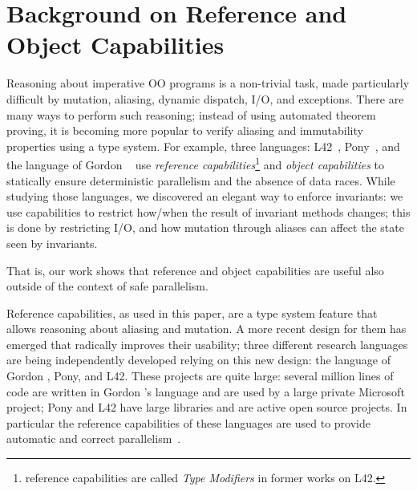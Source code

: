 \section{Background on Reference and Object Capabilities}
\label{s:TMsAndOCs}
Reasoning about imperative OO programs is a non-trivial task,
made particularly difficult by mutation, aliasing, dynamic dispatch, I/O, and exceptions. There are many ways to perform such reasoning;
instead of using automated theorem proving, 
it is becoming more popular to verify aliasing and immutability properties using a type system.
For example, three languages: L42~\cite{ServettoZucca15,ServettoEtAl13a,JOT:issue_2011_01/article1,GianniniEtAl16}, Pony~\cite{clebsch2015deny,clebsch2017orca}, and the language of Gordon \etal~\cite{GordonEtAl12} use \emph{reference capabilities}\footnote{reference capabilities are called \emph{Type Modifiers} in former works on L42.} and \emph{object capabilities} to statically ensure  deterministic parallelism and the absence of data races.
While studying those languages, we discovered an elegant way to enforce invariants: we use capabilities to restrict how/when the result of invariant methods changes; this is done by restricting I/O, and how mutation through aliases can affect the state seen by invariants.

That is, our work shows that reference and object capabilities are useful also outside of the context of safe parallelism.



Reference capabilities, as used in this paper, are a type system feature that allows reasoning about aliasing and mutation. A more recent design for them has emerged that radically improves their usability;
three different research languages are being independently developed relying on this new design: the language of Gordon \etal, Pony, and L42.
These projects are quite large: several million lines of code are written in Gordon \etal's language and are used by a large private Microsoft project; Pony and L42 have large libraries and are active open source projects. In particular the reference capabilities of these languages are used to provide automatic and correct parallelism~\cite{GordonEtAl12,clebsch2015deny,clebsch2017orca,ServettoEtAl13a}.

